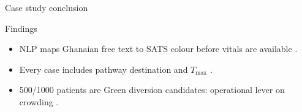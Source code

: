 \begin{frame}{Case study conclusion}
  \small
  \begin{block}{Findings}
    \begin{itemize}
      \item NLP maps Ghanaian free text to SATS colour before vitals are available \citep{Stewart2023, Gligorijevic2018, thisstudy2026}.
      \item Every case includes pathway destination and $T_{\max}$ \citep{Sundstrom2014, thisstudy2026}.
      \item 500/1000 patients are Green diversion candidates: operational lever on crowding \citep{Yilmaz2021, thisstudy2026}.
    \end{itemize}
  \end{block}

\end{frame}
